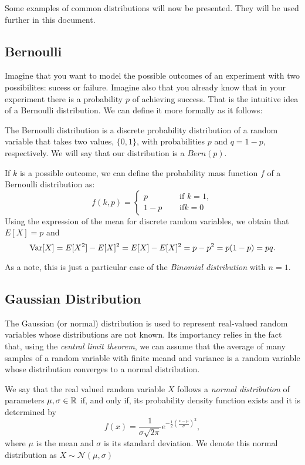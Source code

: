 Some examples of common distributions will now be presented. They will be used further in this document.

\subsection{Bernoulli}

Imagine that you want to model the possible outcomes of an experiment with two possibilites: sucess or failure. Imagine also that you already know that in your experiment there is a probability $p$ of 
achieving success. That is the intuitive idea of a Bernoulli distribution. We can define it more formally as it follows: 

The Bernoulli distribution is a discrete probability distribution of a random variable that takes two values, $\{0,1\}$, with probabilities $p$ and $q = 1-p$, respectively. We will say that our distribution is a $Bern(p)$.

If $k$ is a possible outcome, we can define
the probability mass function $f$ of a Bernoulli distribution as:
$$
f(k,p) = 
\begin{cases} 
p \quad & \text{ if } k=1,\\
1-p \quad & \text{ if} k = 0
\end{cases}
$$
Using the expression of the mean for discrete random variables, we obtain that $E[X] = p$ and 
$$
\operatorname*{Var}[X] = E[X^2] - E[X]^2 = E[X] - E[X]^2 = p-p^2 = p(1-p) = pq.
$$

As a note, this is just a particular case of the \emph{Binomial distribution} with $n=1$.

\subsection{Gaussian Distribution}

The Gaussian (or normal) distribution is used to represent real-valued random variables whose distributions are not known.
Its importancy relies in the fact that, using the \emph{central limit theorem}, we can assume that the average of many samples of
a random variable with finite meand and variance is a random variable whose distribution converges to a normal distribution.

\begin{ndef}
We say that the real valued random variable $X$ follows a \emph{normal distribution} of parameters $\mu,\sigma\in \mathbb{R}$ if, and only if,
its probability density function exists and it is determined by
\[
f(x) = \frac{1}{\sigma \sqrt{2\pi}}e^{-\frac{1}{2}\left( \frac{x - \mu}{\sigma}\right)^2},
\]
where $\mu$ is the mean and $\sigma$ is its standard deviation. We denote this normal distribution as $X \sim \mathcal N (\mu,\sigma)$
\end{ndef}


